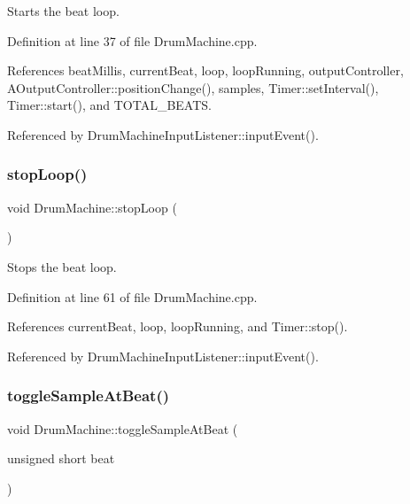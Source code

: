 Starts the beat loop. 

Definition at line 37 of file Drum\+Machine.\+cpp.



References beat\+Millis, current\+Beat, loop, loop\+Running, output\+Controller, A\+Output\+Controller\+::position\+Change(), samples, Timer\+::set\+Interval(), Timer\+::start(), and T\+O\+T\+A\+L\+\_\+\+B\+E\+A\+TS.



Referenced by Drum\+Machine\+Input\+Listener\+::input\+Event().

\mbox{\label{class_drum_machine_af1564a42f1c2717534a61437617070b3}} 
\subsubsection{\texorpdfstring{stop\+Loop()}{stopLoop()}}
{\footnotesize\ttfamily void Drum\+Machine\+::stop\+Loop (\begin{DoxyParamCaption}{ }\end{DoxyParamCaption})}

Stops the beat loop. 

Definition at line 61 of file Drum\+Machine.\+cpp.



References current\+Beat, loop, loop\+Running, and Timer\+::stop().



Referenced by Drum\+Machine\+Input\+Listener\+::input\+Event().

\mbox{\label{class_drum_machine_ac34e64779cd419a75628630f71a3041b}} 
\subsubsection{\texorpdfstring{toggle\+Sample\+At\+Beat()}{toggleSampleAtBeat()}}
{\footnotesize\ttfamily void Drum\+Machine\+::toggle\+Sample\+At\+Beat (\begin{DoxyParamCaption}\item[{unsigned short}]{beat }\end{DoxyParamCaption})}

